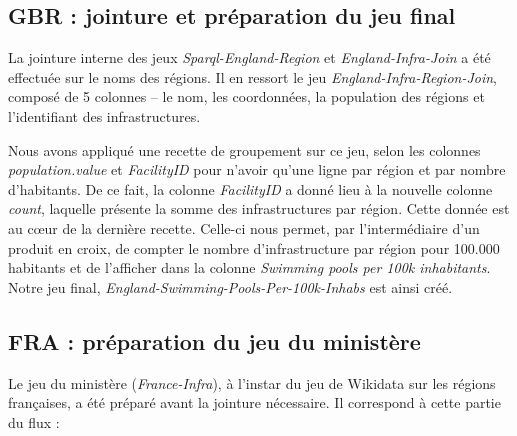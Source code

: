 \documentclass[hidelinks, 12pt]{report}
\begin{document}
%





\subsection{GBR : jointure et préparation du jeu final}

La jointure interne des jeux \textit{Sparql-England-Region} et \textit{England-Infra-Join} a été effectuée sur le noms des régions. Il en ressort le jeu \textit{England-Infra-Region-Join}, composé de 5 colonnes -- le nom, les coordonnées, la population des régions et l'identifiant des infrastructures.

Nous avons appliqué une recette de groupement sur ce jeu, selon les colonnes \textit{population.value} et \textit{FacilityID} pour n'avoir qu'une ligne par région et par nombre d'habitants. De ce fait, la colonne \textit{FacilityID} a donné lieu à la nouvelle colonne \textit{count}, laquelle présente la somme des infrastructures par région. Cette donnée est au cœur de la dernière recette. Celle-ci nous permet, par l'intermédiaire d'un produit en croix, de compter le nombre d'infrastructure par région pour 100.000 habitants et de l'afficher dans la colonne \textit{Swimming pools per 100k inhabitants}. Notre jeu final, \textit{England-Swimming-Pools-Per-100k-Inhabs} est ainsi créé.





%





\subsection{FRA : préparation du jeu du ministère}

Le jeu du ministère (\textit{France-Infra}), à l'instar du jeu de Wikidata sur les régions françaises, a été préparé avant la jointure nécessaire. Il correspond à cette partie du flux :
\end{document}
